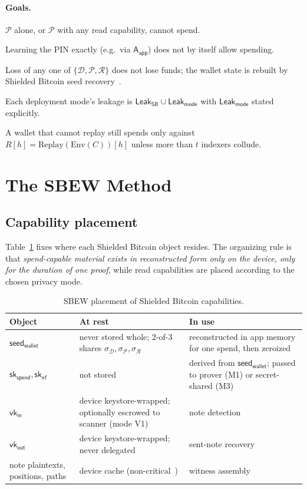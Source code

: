 \documentclass[11pt]{article}
\theoremstyle{remark}
\newcommand{\sk}{\mathsf{sk}}
\newcommand{\vk}{\mathsf{vk}}
\newcommand{\seed}{\mathsf{seed}_{\mathsf{wallet}}}
\newcommand{\Leak}{\mathsf{Leak}}
\newcommand{\SB}{Shielded Bitcoin}
\newcommand{\sysname}{\textsf{SBEW}}
\begin{document}
\paragraph{Goals.}
\begin{description}[leftmargin=1em,style=nextline]
  \item[E1 Non-custody.] $\mathcal{P}$ alone, or $\mathcal{P}$ with any read capability, cannot spend.
  \item[E2 PIN-leak tolerance.] Learning the PIN exactly (e.g.\ via $\mathsf{A}_{\mathsf{app}}$) does not by itself allow spending.
  \item[E3 Recovery.] Loss of any one of $\{\mathcal{D}, \mathcal{P}, \mathcal{R}\}$ does not lose funds; the wallet state is rebuilt by \SB{} seed recovery~\cite[§16.4]{sb26}.
  \item[E4 Bounded leakage.] Each deployment mode's leakage is $\Leak_{\mathsf{SB}} \cup \Leak_{\mathsf{mode}}$ with $\Leak_{\mathsf{mode}}$ stated explicitly.
  \item[E5 Sync integrity.] A wallet that cannot replay still spends only against $R[h] = \mathrm{Replay}(\mathrm{Env}(C))[h]$ unless more than $t$ indexers collude.
\end{description}

\section{The \sysname{} Method}
\label{sec:method}

\subsection{Capability placement}
Table~\ref{tab:place} fixes where each \SB{} object resides. The organizing rule is that \emph{spend-capable material exists in reconstructed form only on the device, only for the duration of one proof}, while read capabilities are placed according to the chosen privacy mode.

\begin{table}[t]
\centering\small
\begin{tabularx}{\linewidth}{@{}lXX@{}}
\toprule
Object & At rest & In use \\
\midrule
$\seed$ & never stored whole; 2-of-3 shares $\sigma_{\mathcal{D}}, \sigma_{\mathcal{P}}, \sigma_{\mathcal{R}}$ & reconstructed in app memory for one spend, then zeroized \\
$\sk_{\mathsf{spend}}, \sk_{\mathsf{nf}}$ & not stored & derived from $\seed$; passed to prover (M1) or secret-shared (M3) \\
$\vk_{\mathsf{in}}$ & device keystore-wrapped; optionally escrowed to scanner (mode V1) & note detection \\
$\vk_{\mathsf{out}}$ & device keystore-wrapped; never delegated & sent-note recovery \\
note plaintexts, positions, paths & device cache (non-critical~\cite[§16]{sb26}) & witness assembly \\
\bottomrule
\end{tabularx}
\caption{\sysname{} placement of \SB{} capabilities.}
\label{tab:place}
\end{table}
\end{document}
